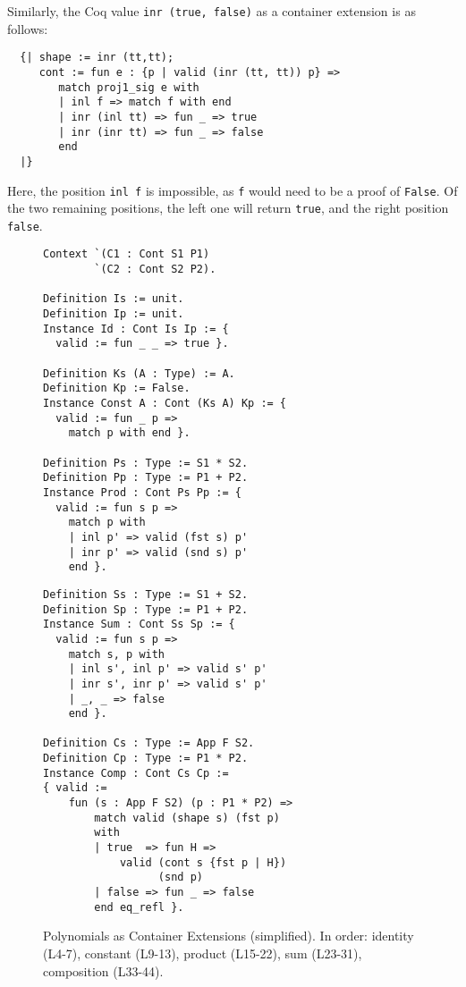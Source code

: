 \documentclass[a4paper, UKenglish, cleveref, autoref, thm-restate]{lipics-v2021}
\begin{document}
Similarly, the Coq value \texttt{inr (true, false)} as a container
extension is as follows:
\begin{verbatim}
  {| shape := inr (tt,tt);
     cont := fun e : {p | valid (inr (tt, tt)) p} =>
        match proj1_sig e with
        | inl f => match f with end
        | inr (inl tt) => fun _ => true
        | inr (inr tt) => fun _ => false
        end
  |}
\end{verbatim}
Here, the position \texttt{inl f} is impossible, as
\texttt{f} would need to be a proof of \texttt{False}.
Of the two remaining positions, the left one will return 
\texttt{true}, and the right position \texttt{false}.
\begin{figure}
\begin{minipage}{.52\textwidth}
  \begin{verbatim}
Context `(C1 : Cont S1 P1) 
        `(C2 : Cont S2 P2).

Definition Is := unit.
Definition Ip := unit.
Instance Id : Cont Is Ip := {
  valid := fun _ _ => true }.

Definition Ks (A : Type) := A.
Definition Kp := False.
Instance Const A : Cont (Ks A) Kp := {
  valid := fun _ p =>
    match p with end }.

Definition Ps : Type := S1 * S2.
Definition Pp : Type := P1 + P2.
Instance Prod : Cont Ps Pp := {
  valid := fun s p => 
    match p with
    | inl p' => valid (fst s) p'
    | inr p' => valid (snd s) p'
    end }.
\end{verbatim}
\end{minipage}
\begin{minipage}{.47\textwidth}
  \begin{verbatim}
Definition Ss : Type := S1 + S2.
Definition Sp : Type := P1 + P2.
Instance Sum : Cont Ss Sp := {
  valid := fun s p => 
    match s, p with
    | inl s', inl p' => valid s' p'
    | inr s', inr p' => valid s' p'
    | _, _ => false
    end }.

Definition Cs : Type := App F S2.
Definition Cp : Type := P1 * P2.
Instance Comp : Cont Cs Cp := 
{ valid :=  
    fun (s : App F S2) (p : P1 * P2) =>
        match valid (shape s) (fst p) 
        with
        | true  => fun H =>
            valid (cont s {fst p | H}) 
                  (snd p)
        | false => fun _ => false
        end eq_refl }.
  \end{verbatim}
\end{minipage}
  \caption{Polynomials as Container Extensions (simplified). In order: identity
  (L4-7), constant (L9-13), product (L15-22), sum (L23-31), composition
  (L33-44).}
  \label{fig:poly}
\end{figure}
\end{document}
